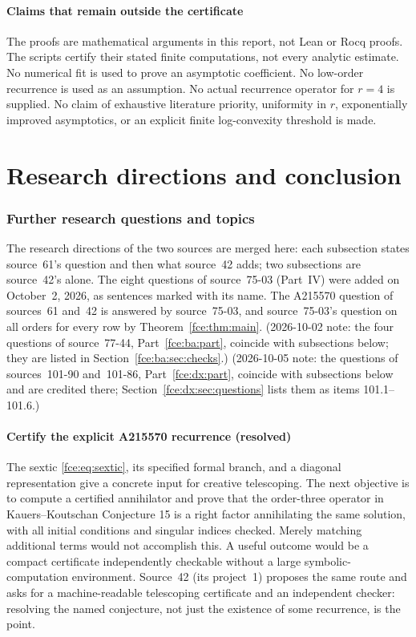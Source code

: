 \documentclass[11pt,a4paper]{article}
\numberwithin{equation}{section}
\theoremstyle{definition}\newtheorem{definition}[theorem]{Definition}
\theoremstyle{remark}\newtheorem{remark}[theorem]{Remark}
\begin{document}
\subsection{Claims that remain outside the certificate}
The proofs are mathematical arguments in this report, not Lean or Rocq
proofs. The scripts certify their stated finite computations, not every
analytic estimate. No numerical fit is used to prove an asymptotic
coefficient. No low-order recurrence is used as an assumption. No actual
recurrence operator for $r=4$ is supplied. No claim of exhaustive
literature priority, uniformity in $r$, exponentially improved asymptotics,
or an explicit finite log-convexity threshold is made.

\part{Research directions and conclusion}\label{fce:part:three}
\section{Further research questions and topics}\label{fce:sec:future}
The research directions of the two sources are merged here: each subsection
states source~61's question and then what source~42 adds; two subsections
are source~42's alone. The eight questions of source~75-03 (Part~IV) were
added on October~2, 2026, as sentences marked with its name. The
A215570 question of sources~61 and~42 is answered by source~75-03, and
source~75-03's question on all orders for every row by
Theorem~\ref{fce:thm:main}. (2026-10-02 note: the four questions of
source~77-44, Part~\ref{fce:ba:part}, coincide with subsections below; they
are listed in Section~\ref{fce:ba:sec:checks}.) (2026-10-05 note: the questions of sources~101-90 and~101-86, Part~\ref{fce:dx:part},
coincide with subsections below and are credited there;
Section~\ref{fce:dx:sec:questions} lists them as items 101.1--101.6.)
\subsection{Certify the explicit A215570 recurrence (resolved)}
The sextic \eqref{fce:eq:sextic}, its specified formal branch, and a diagonal
representation give a concrete input for creative telescoping. The next
objective is to compute a certified annihilator and prove that the
order-three operator in Kauers--Koutschan Conjecture 15 is a right factor
annihilating the same solution, with all initial conditions and singular
indices checked. Merely matching additional terms would not accomplish
this. A useful outcome would be a compact certificate independently
checkable without a large symbolic-computation environment. Source~42
(its project~1) proposes the same route and asks for a machine-readable
telescoping certificate and an independent checker: resolving the named
conjecture, not just the existence of some recurrence, is the point.
\end{document}
